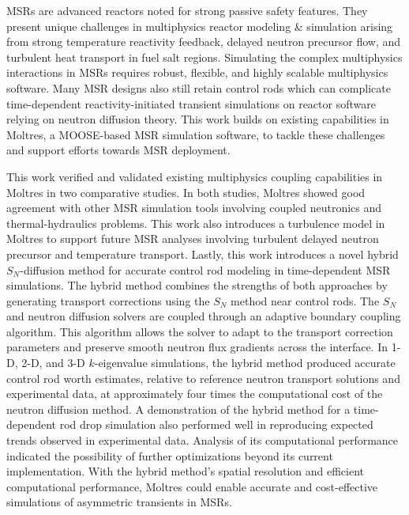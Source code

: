 \glspl{MSR} are advanced reactors noted for strong passive safety features.
They present unique challenges in multiphysics reactor modeling \& simulation arising from
strong temperature reactivity feedback, delayed neutron precursor flow, and turbulent heat transport
in fuel salt regions. Simulating the complex multiphysics interactions in
\glspl{MSR} requires robust, flexible, and highly scalable multiphysics software. Many \gls{MSR}
designs also still retain control rods which can complicate time-dependent reactivity-initiated
transient simulations on reactor software relying on neutron diffusion theory.
This work builds on existing capabilities in Moltres, a MOOSE-based \gls{MSR} simulation software,
to tackle these challenges and support efforts towards \gls{MSR} deployment.

This work verified and validated existing multiphysics coupling capabilities in Moltres in two
comparative studies. In both studies, Moltres showed good agreement with other \gls{MSR} simulation tools
involving coupled neutronics and thermal-hydraulics problems. This work also introduces a
turbulence model in Moltres to support future \gls{MSR} analyses involving turbulent delayed
neutron precursor and temperature transport. Lastly, this work introduces a novel hybrid
$S_N$-diffusion method for accurate control rod modeling in time-dependent \gls{MSR} simulations.
The hybrid method combines the strengths of both approaches by generating transport corrections
using the $S_N$ method near control rods. The $S_N$ and neutron diffusion solvers are coupled
through an adaptive boundary coupling algorithm. This algorithm allows the solver to adapt to the
transport correction parameters and preserve smooth neutron flux gradients across the interface.
In 1-D, 2-D, and 3-D $k$-eigenvalue simulations, the hybrid method produced accurate control
rod worth estimates, relative to reference neutron transport solutions and experimental data,
at approximately four times the computational cost of the neutron diffusion method.
A demonstration of the hybrid method for a time-dependent rod drop
simulation also performed well in reproducing expected trends observed in experimental data.
Analysis of its computational performance indicated the possibility of further optimizations
beyond its current implementation. With the hybrid method's spatial resolution and
efficient computational performance, Moltres could enable accurate and cost-effective simulations
of asymmetric transients in \glspl{MSR}.
